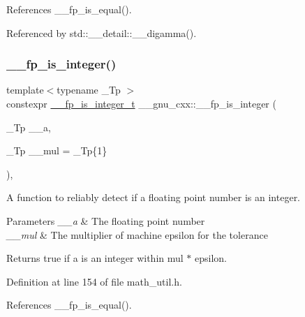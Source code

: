 References \+\_\+\+\_\+fp\+\_\+is\+\_\+equal().



Referenced by std\+::\+\_\+\+\_\+detail\+::\+\_\+\+\_\+digamma().

\mbox{\label{namespace____gnu__cxx_ab425c7f3a50b494efaa2e6bdb6e55f08}} 
\subsubsection{\texorpdfstring{\+\_\+\+\_\+fp\+\_\+is\+\_\+integer()}{\_\_fp\_is\_integer()}}
{\footnotesize\ttfamily template$<$typename \+\_\+\+Tp $>$ \\
constexpr \hyperlink{struct____gnu__cxx_1_1____fp__is__integer__t}{\+\_\+\+\_\+fp\+\_\+is\+\_\+integer\+\_\+t} \+\_\+\+\_\+gnu\+\_\+cxx\+::\+\_\+\+\_\+fp\+\_\+is\+\_\+integer (\begin{DoxyParamCaption}\item[{\+\_\+\+Tp}]{\+\_\+\+\_\+a,  }\item[{\+\_\+\+Tp}]{\+\_\+\+\_\+mul = {\ttfamily \+\_\+Tp\{1\}} }\end{DoxyParamCaption})\hspace{0.3cm}{\ttfamily [inline]}, {\ttfamily [noexcept]}}

A function to reliably detect if a floating point number is an integer.


\begin{DoxyParams}{Parameters}
{\em \+\_\+\+\_\+a} & The floating point number \\
\hline
{\em \+\_\+\+\_\+mul} & The multiplier of machine epsilon for the tolerance \\
\hline
\end{DoxyParams}
\begin{DoxyReturn}{Returns}
{\ttfamily true} if a is an integer within mul $\ast$ epsilon. 
\end{DoxyReturn}


Definition at line 154 of file math\+\_\+util.\+h.



References \+\_\+\+\_\+fp\+\_\+is\+\_\+equal().



